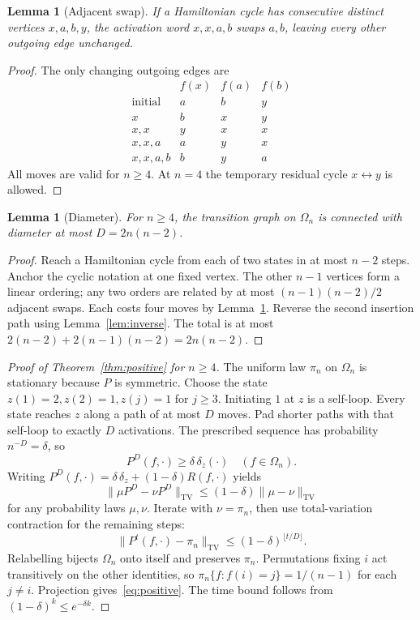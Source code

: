 \documentclass[11pt]{article}
\newtheorem{lemma}[theorem]{Lemma}
\newcommand{\TV}{\mathrm{TV}}
\begin{document}
\begin{lemma}[Adjacent swap]
\label{lem:swap}
If a Hamiltonian cycle has consecutive distinct vertices $x,a,b,y$,
the activation word $x,x,a,b$ swaps $a,b$, leaving every other
outgoing edge unchanged.
\end{lemma}
\begin{proof}
The only changing outgoing edges are
\[
\begin{array}{c|ccc}
 & f(x)&f(a)&f(b)\\ \hline
\text{initial}&a&b&y\\
x&b&x&y\\
x,x&y&x&x\\
x,x,a&a&y&x\\
x,x,a,b&b&y&a
\end{array}
\]
All moves are valid for $n\ge4$. At $n=4$ the temporary residual
cycle $x\leftrightarrow y$ is allowed.
\end{proof}

\begin{lemma}[Diameter]
\label{lem:diameter}
For $n\ge4$, the transition graph on $\Omega_n$ is connected with
diameter at most $D=2n(n-2)$.
\end{lemma}
\begin{proof}
Reach a Hamiltonian cycle from each of two states in at most $n-2$
steps. Anchor the cyclic notation at one fixed vertex. The other
$n-1$ vertices form a linear ordering; any two orders are related
by at most $(n-1)(n-2)/2$ adjacent swaps. Each costs four moves by
Lemma~\ref{lem:swap}. Reverse the second insertion path using
Lemma~\ref{lem:inverse}. The total is at most
$2(n-2)+2(n-1)(n-2)=2n(n-2)$.
\end{proof}

\begin{proof}[Proof of Theorem~\ref{thm:positive} for $n\ge4$]
The uniform law $\pi_n$ on $\Omega_n$ is stationary because $P$ is
symmetric. Choose the state
$z(1)=2,z(2)=1,z(j)=1$ for $j\ge3$. Initiating $1$ at $z$ is a
self-loop. Every state reaches $z$ along a path of at most $D$ moves.
Pad shorter paths with that self-loop to exactly $D$ activations.
The prescribed sequence has probability $n^{-D}=\delta$, so
\[
 P^D(f,\cdot)\ge\delta\,\delta_z(\cdot)\quad(f\in\Omega_n).
\]
Writing $P^D(f,\cdot)=\delta\,\delta_z+(1-\delta)R(f,\cdot)$ yields
\[
 \|\mu P^D-\nu P^D\|_{\TV}
 \le(1-\delta)\|\mu-\nu\|_{\TV}
\]
for any probability laws $\mu,\nu$. Iterate with $\nu=\pi_n$,
then use total-variation contraction for the remaining steps:
\[
 \|P^t(f,\cdot)-\pi_n\|_{\TV}
 \le(1-\delta)^{\lfloor t/D\rfloor}.
\]
Relabelling bijects $\Omega_n$ onto itself and preserves $\pi_n$.
Permutations fixing $i$ act transitively on the other identities, so
$\pi_n\{f:f(i)=j\}=1/(n-1)$ for each $j\ne i$.
Projection gives~\eqref{eq:positive}. The time bound follows from
$(1-\delta)^k\le e^{-\delta k}$.
\end{proof}
\end{document}

